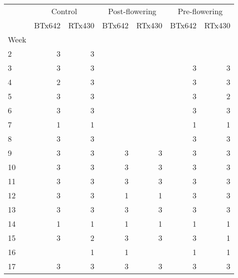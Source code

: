 \begin{tabular}{lrrrrrr}
\toprule
{} & \multicolumn{2}{c}{Control} & \multicolumn{2}{c}{Post-flowering} & \multicolumn{2}{c}{Pre-flowering} \\
{} &  BTx642 & RTx430 &         BTx642 & RTx430 &        BTx642 & RTx430 \\
Week &         &        &                &        &               &        \\
\midrule
2    &       3 &      3 &                &        &               &        \\
3    &       3 &      3 &                &        &             3 &      3 \\
4    &       2 &      3 &                &        &             3 &      3 \\
5    &       3 &      3 &                &        &             3 &      2 \\
6    &       3 &      3 &                &        &             3 &      3 \\
7    &       1 &      1 &                &        &             1 &      1 \\
8    &       3 &      3 &                &        &             3 &      3 \\
9    &       3 &      3 &              3 &      3 &             3 &      3 \\
10   &       3 &      3 &              3 &      3 &             3 &      3 \\
11   &       3 &      3 &              3 &      3 &             3 &      3 \\
12   &       3 &      3 &              1 &      1 &             3 &      3 \\
13   &       3 &      3 &              3 &      3 &             3 &      3 \\
14   &       1 &      1 &              1 &      1 &             1 &      1 \\
15   &       3 &      2 &              3 &      3 &             3 &      1 \\
16   &         &      1 &              1 &        &             1 &      1 \\
17   &       3 &      3 &              3 &      3 &             3 &      3 \\
\bottomrule
\end{tabular}
